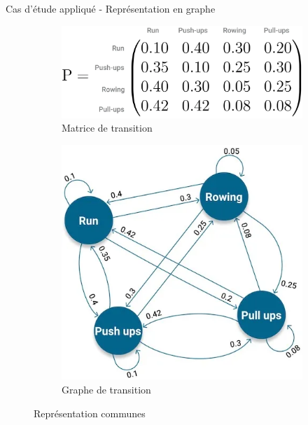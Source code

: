 \documentclass[aspectratio=169,xcolor=dvipsnames, t]{beamer}
\begin{document}
\begin{frame}{Cas d'étude appliqué - Représentation en graphe}
	
	\begin{figure}
		\centering
		\begin{subfigure}{.5\textwidth}
			\centering
			\includegraphics[width=\linewidth]{figures/matriceTransition.png}
			\caption{Matrice de transition}
			\label{fig:sub1}
		\end{subfigure}%
		\begin{subfigure}{.5\textwidth}
			\centering
			\includegraphics[width=0.7\linewidth]{figures/grapheTransition.png}
			\caption{Graphe de transition}
			\label{fig:sub2}
		\end{subfigure}
		\caption{Représentation communes}
		\label{fig:test}
	\end{figure}
	
\end{frame}
\end{document}
